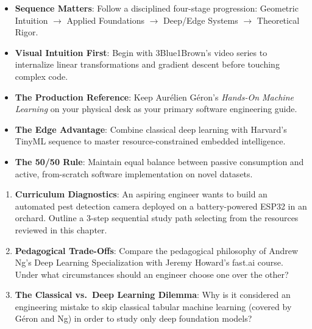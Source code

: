 \begin{takeaways}
\begin{itemize}
    \item \textbf{Sequence Matters}: Follow a disciplined four-stage progression: Geometric Intuition $\to$ Applied Foundations $\to$ Deep/Edge Systems $\to$ Theoretical Rigor.
    \item \textbf{Visual Intuition First}: Begin with 3Blue1Brown's video series to internalize linear transformations and gradient descent before touching complex code.
    \item \textbf{The Production Reference}: Keep Aurélien Géron's \emph{Hands-On Machine Learning} on your physical desk as your primary software engineering guide.
    \item \textbf{The Edge Advantage}: Combine classical deep learning with Harvard's TinyML sequence to master resource-constrained embedded intelligence.
    \item \textbf{The 50/50 Rule}: Maintain equal balance between passive consumption and active, from-scratch software implementation on novel datasets.
\end{itemize}
\end{takeaways}

\begin{checkyourself}
\begin{enumerate}
    \item \textbf{Curriculum Diagnostics}: An aspiring engineer wants to build an automated pest detection camera deployed on a battery-powered ESP32 in an orchard. Outline a 3-step sequential study path selecting from the resources reviewed in this chapter.
    \item \textbf{Pedagogical Trade-Offs}: Compare the pedagogical philosophy of Andrew Ng's Deep Learning Specialization with Jeremy Howard's fast.ai course. Under what circumstances should an engineer choose one over the other?
    \item \textbf{The Classical vs.\ Deep Learning Dilemma}: Why is it considered an engineering mistake to skip classical tabular machine learning (covered by Géron and Ng) in order to study only deep foundation models?
\end{enumerate}
\end{checkyourself}

